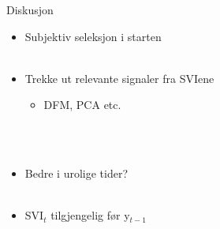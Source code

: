 \documentclass{beamer}
\begin{document}
\begin{frame}{Diskusjon}
	\begin{itemize}
  		\item Subjektiv seleksjon i starten \\~\\
  		\item Trekke ut relevante signaler fra SVIene
  			\begin{itemize}
  				\item DFM, PCA etc.
  			\end{itemize} \ \\~\\
  		\item Bedre i urolige tider? \\~\\
  		\item SVI$_t$ tilgjengelig før y$_{t-1}$
  	\end{itemize}
\end{frame}
\end{document}
